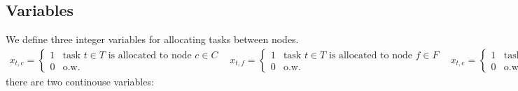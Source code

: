 \documentclass[conference]{IEEEtran}
\begin{document}
    \subsection{Variables}

    We define three integer variables for allocating tasks between nodes.
    \begin{subequations}
      \begin{align}
        x_{t,c} =
        \begin{cases}
          1 & \text{task $t \in T$ is allocated to node $c \in C$} \\
          0 & \text{o.w.}
        \end{cases}
      \end{align}

      \begin{align}
        x_{t,f} =
        \begin{cases}
          1 & \text{task $t \in T$ is allocated to node $f \in F$} \\
          0 & \text{o.w.}
        \end{cases}
      \end{align}

     \begin{align}
       x_{t,e} =
       \begin{cases}
         1 & \text{task $t \in T$ is allocated to node $e \in E$} \\
         0 & \text{o.w.}
      \end{cases}
     \end{align}
  \end{subequations}
  there are two continouse variables:
\end{document}
